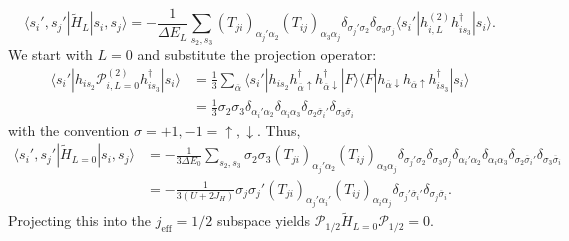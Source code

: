 \documentclass[11pt, a4paper]{article}
\begin{document}
\begin{equation}
\langle s_i', s_j' | \tilde{H}_L | s_i, s_j \rangle = -\frac{1}{\Delta E_L} \sum_{s_2, s_3} (T_{ji})_{\alpha_j' \alpha_2} (T_{ij})_{\alpha_3 \alpha_j} \delta_{\sigma_j' \sigma_2} \delta_{\sigma_3 \sigma_j} \langle s_i' | h_{i, L}^{(2)} h_{is_3}^{\dagger} | s_i \rangle.
\end{equation}
We start with $L=0$ and substitute the projection operator:
\begin{align}
\langle s_i' | h_{is_2} \mathcal{P}_{i, L=0}^{(2)} h_{is_3}^{\dagger} | s_i \rangle &= \frac{1}{3} \sum_{\overline{\alpha}} \langle s_i' | h_{is_2} h_{\overline{\alpha}\uparrow}^{\dagger} h_{\overline{\alpha}\downarrow}^{\dagger} | F \rangle \langle F | h_{\overline{\alpha}\downarrow} h_{\overline{\alpha}\uparrow} h_{is_3}^{\dagger} | s_i \rangle \nonumber \\
&= \frac{1}{3} \sigma_2 \sigma_3 \delta_{\alpha_i' \alpha_2} \delta_{\alpha_i \alpha_3} \delta_{\sigma_2 \overline{\sigma}_i'} \delta_{\sigma_3 \overline{\sigma}_i}
\end{align}
with the convention $\sigma = +1, -1 = \uparrow, \downarrow$. Thus,
\begin{align}
\langle s_i', s_j' | \tilde{H}_{L=0} | s_i, s_j \rangle &= -\frac{1}{3\Delta E_0} \sum_{s_2, s_3} \sigma_2 \sigma_3 (T_{ji})_{\alpha_j' \alpha_2} (T_{ij})_{\alpha_3 \alpha_j} \delta_{\sigma_j' \sigma_2} \delta_{\sigma_3 \sigma_j} \delta_{\alpha_i' \alpha_2} \delta_{\alpha_i \alpha_3} \delta_{\sigma_2 \overline{\sigma}_i'} \delta_{\sigma_3 \overline{\sigma}_i} \nonumber \\
&= -\frac{1}{3(U+2J_H)} \sigma_j \sigma_j' (T_{ji})_{\alpha_j' \alpha_i'} (T_{ij})_{\alpha_i \alpha_j} \delta_{\sigma_j' \overline{\sigma}_i'} \delta_{\sigma_j \overline{\sigma}_i}.
\end{align}
Projecting this into the $j_{\text{eff}}=1/2$ subspace yields $\mathcal{P}_{1/2} \tilde{H}_{L=0} \mathcal{P}_{1/2} = 0$.
\end{document}
